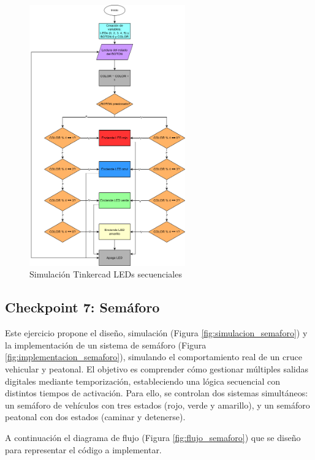 \documentclass{article}
\begin{document}
\begin{figure}[H]
    \centering
    \includegraphics[width=0.6\textwidth]{./img/ckpt_6_1.png}
    \caption{Simulación Tinkercad LEDs secuenciales}
    \label{fig:leds_secuenciales_flowchart}
\end{figure}

\subsection{Checkpoint 7: Sem\'aforo}

Este ejercicio propone el diseño, simulación (Figura \ref{fig:simulacion_semaforo}) y la implementación de un sistema de semáforo (Figura \ref{fig:implementacion_semaforo}), simulando el comportamiento real de un cruce vehicular y peatonal. El objetivo es comprender cómo gestionar múltiples salidas digitales mediante temporización, estableciendo una lógica secuencial con distintos tiempos de activación. Para ello, se controlan dos sistemas simultáneos: un semáforo de vehículos con tres estados (rojo, verde y amarillo), y un semáforo peatonal con dos estados (caminar y detenerse).

A continuación el diagrama de flujo (Figura \ref{fig:flujo_semaforo}) que se diseño para representar el código a implementar.
\end{document}
